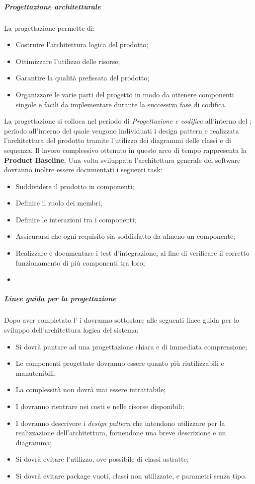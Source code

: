 	\subparagraph{Progettazione architetturale}
	La progettazione permette di:
	\begin{itemize}
		\item Costruire l'architettura logica del prodotto;
		\item Ottimizzare l'utilizzo delle risorse;
		\item Garantire la qualità prefissata del prodotto;
		\item Organizzare le varie parti del progetto in modo da ottenere componenti singole e facili da implementare durante la successiva fase di codifica.
	\end{itemize}
	
	La progettazione si colloca nel periodo di \emph{Progettazione e codifica} all'interno del \PdP{}; periodo all'interno del quale vengono individuati i design pattern e realizzata l'architettura del prodotto tramite l'utilizzo dei diagrammi delle classi e di sequenza. Il lavoro complessivo ottenuto in questo arco di tempo rappresenta la \textbf{Product Baseline}. Una volta sviluppata l'architettura generale del software dovranno inoltre essere documentati i seguenti task:
	\begin{itemize}
		\item Suddividere il prodotto in componenti;
		\item Definire il ruolo dei membri;
		\item Definire le interazioni tra i componenti;
		\item Assicurarsi che ogni requisito sia soddisfatto da almeno un componente;
		\item Realizzare e documentare i test d'integrazione, al fine di verificare il corretto funzionamento di più componenti tra loro;
		\item 
	\end{itemize}


	\subparagraph{Linee guida per la progettazione}
	Dopo aver completato l'\AdR{} i \progs{} dovranno sottostare alle seguenti linee guida per lo sviluppo dell'architettura logica del sistema:
	\begin{itemize}
		\item Si dovrà puntare ad una progettazione chiara e di immediata comprensione;
		\item Le componenti progettate dovranno essere quanto più riutilizzabili e manutenibili;
		\item La complessità non dovrà mai essere intrattabile;
		\item I \progs{} dovranno rientrare nei costi e nelle risorse disponibili;
		\item I \progs{} dovranno descrivere i \emph{design pattern} che intendono utilizzare per la realizzazione dell'architettura, fornendone una breve descrizione e un diagramma;
		\item Si dovrà evitare l'utilizzo, ove possibile di classi astratte;
		\item Si dovrà evitare package vuoti, classi non utilizzate, e parametri senza tipo.
	\end{itemize}

